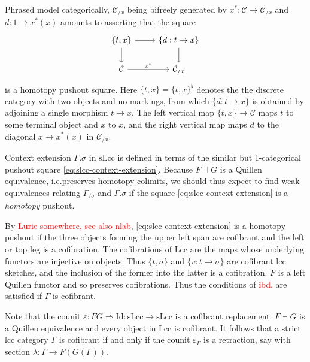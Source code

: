 \documentclass[a4paper]{article}
\newcommand{\todo}[1]{\textcolor{red}{#1}}
\theoremstyle{remark}
\theoremstyle{definition}
\begin{document}
Phrased model categorically, $\mathcal{C}_{/ x}$ being bifreely generated by $x^* : \mathcal{C} \rightarrow \mathcal{C}_{/ x}$ and $d : 1 \rightarrow x^*(x)$ amounts to asserting that the square
\begin{equation}
  \label{eq:homotopy-pushout-lcc}
  \begin{tikzcd}
    \{ t, x \} \arrow[r] \arrow[d] & \{ d : t \rightarrow x \} \arrow[d] \\
    \mathcal{C} \arrow[r, "x^*"] & \mathcal{C}_{/ x}
  \end{tikzcd}
\end{equation}
is a homotopy pushout square.
Here $\{t, x\} = \{t, x\}^\flat$ denotes the the discrete category with two objects and no markings, from which $\{d : t \rightarrow x\}$ is obtained by adjoining a single morphism $t \rightarrow x$.
The left vertical map $\{ t, x \} \rightarrow \mathcal{C}$ maps $t$ to some terminal object and $x$ to $x$, and the right vertical map maps $d$ to the diagonal $x \rightarrow x^*(x)$ in $\mathcal{C}_{/ x}$.

Context extension $\Gamma.\sigma$ in $\mathrm{sLcc}$ is defined in terms of the similar but 1-categorical pushout square \eqref{eq:slcc-context-extension}.
Because $F \dashv G$ is a Quillen equivalence, i.e.\@ preserves homotopy colimits, we should thus expect to find weak equivalences relating $\Gamma_{/ \sigma}$ and $\Gamma.\sigma$ if the square \eqref{eq:slcc-context-extension} is a \emph{homotopy} pushout.

By \todo{Lurie somewhere, see also nlab}, \eqref{eq:slcc-context-extension} is a homotopy pushout if the three objects forming the upper left span are cofibrant and the left or top leg is a cofibration.
The cofibrations of $\mathrm{Lcc}$ are the maps whose underlying functors are injective on objects.
Thus $\{t, \sigma\}$ and $\{ v : t \rightarrow \sigma\}$ are cofibrant lcc sketches, and the inclusion of the former into the latter is a cofibration.
$F$ is a left Quillen functor and so preserves cofibrations.
Thus the conditions of \todo{ibd.} are satisfied if $\Gamma$ is cofibrant.

Note that the counit $\varepsilon : FG \Rightarrow \mathrm{Id} : \mathrm{sLcc} \rightarrow \mathrm{sLcc}$ is a cofibrant replacement: $F \dashv G$ is a Quillen equivalence and every object in $\mathrm{Lcc}$ is cofibrant.
It follows that a strict lcc category $\Gamma$ is cofibrant if and only if the counit $\varepsilon_\Gamma$ is a retraction, say with section $\lambda : \Gamma \rightarrow F(G(\Gamma))$.
\end{document}
